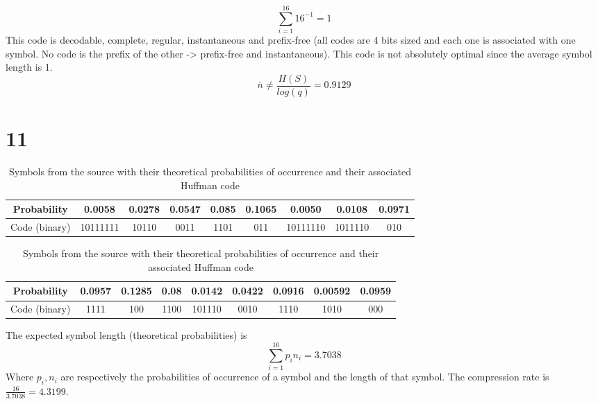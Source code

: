 \documentclass[a4paper,12pt]{article}
\begin{document}
\begin{equation}
\sum_{i=1}^{16} 16^{-1} = 1
\end{equation} 
This code is decodable, complete, regular, instantaneous and prefix-free (all codes are 4 bits sized and each one is associated with one symbol. No code is the prefix of the other -> prefix-free and instantaneous). This code is not absolutely optimal since the average symbol length is 1.
\begin{equation}
\overline{n} \neq \frac{H(S)}{log(q)} = 0.9129
\end{equation} 

\section*{11}

\begin{table}[h!]

\begin{center}

\begin{adjustbox}{max width=\linewidth}
\begin{tabular}{|c|c|c|c|c|c|c|c|c|}
\hline 
Probability & 0.0058 & 0.0278 & 0.0547 & 0.085 & 0.1065 & 0.0050 & 0.0108 & 0.0971 \\ 
\hline 
Code (binary) & 10111111 & 10110 & 0011 & 1101 & 011 & 10111110 & 1011110 & 010 \\ 
\hline 
\end{tabular}
\end{adjustbox} 

\begin{adjustbox}{max width=\linewidth}
\begin{tabular}{|c|c|c|c|c|c|c|c|c|}
\hline 
Probability & 0.0957 & 0.1285 & 0.08 & 0.0142 & 0.0422 & 0.0916 & 0.00592 & 0.0959 \\ 
\hline 
Code (binary) & 1111 & 100 & 1100 & 101110 & 0010 & 1110 & 1010 & 000 \\ 
\hline 
\end{tabular}
\end{adjustbox}
\end{center} 
\caption{Symbols from the source with their theoretical probabilities of occurrence and their associated Huffman code}  
\end{table}

The expected symbol length (theoretical probabilities) is
\begin{equation}
\sum_{i=1}^{16} p_i n_i = 3.7038
\end{equation}
Where $p_i , n_i$ are respectively the probabilities of occurrence of a symbol and the length of that symbol.
The compression rate is $\frac{16}{3.7038} = 4.3199$. 
\end{document}
